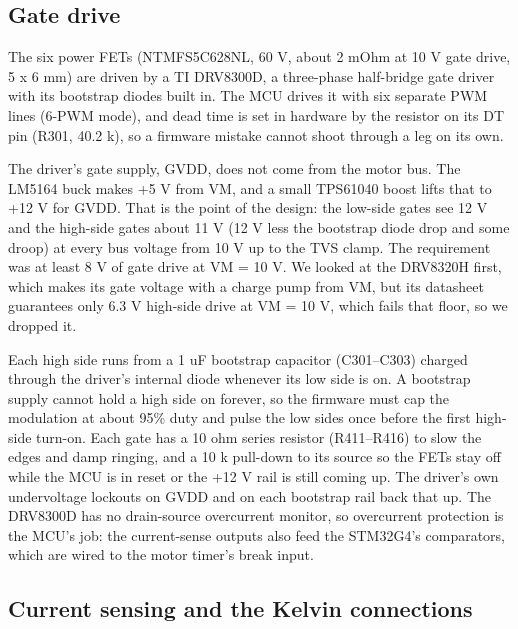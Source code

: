 
\subsection*{Gate drive}

The six power FETs (NTMFS5C628NL, 60 V, about 2 mOhm at 10 V gate drive,
5 x 6 mm) are driven by a TI DRV8300D, a three-phase half-bridge gate driver
with its bootstrap diodes built in. The MCU drives it with six separate PWM
lines (6-PWM mode), and dead time is set in hardware by the resistor on its DT
pin (R301, 40.2 k), so a firmware mistake cannot shoot through a leg on its own.

The driver's gate supply, GVDD, does not come from the motor bus. The LM5164
buck makes +5 V from VM, and a small TPS61040 boost lifts that to +12 V for
GVDD. That is the point of the design: the low-side gates see 12 V and the
high-side gates about 11 V (12 V less the bootstrap diode drop and some droop)
at every bus voltage from 10 V up to the TVS clamp. The requirement was at least
8 V of gate drive at VM = 10 V. We looked at the DRV8320H first, which makes its
gate voltage with a charge pump from VM, but its datasheet guarantees only 6.3 V
high-side drive at VM = 10 V, which fails that floor, so we dropped it.

Each high side runs from a 1 uF bootstrap capacitor (C301--C303) charged through
the driver's internal diode whenever its low side is on. A bootstrap supply
cannot hold a high side on forever, so the firmware must cap the modulation at
about 95\% duty and pulse the low sides once before the first high-side turn-on.
Each gate has a 10 ohm series resistor (R411--R416) to slow the edges and damp
ringing, and a 10 k pull-down to its source so the FETs stay off while the MCU is
in reset or the +12 V rail is still coming up. The driver's own undervoltage
lockouts on GVDD and on each bootstrap rail back that up. The DRV8300D has no
drain-source overcurrent monitor, so overcurrent protection is the MCU's job:
the current-sense outputs also feed the STM32G4's comparators, which are wired to
the motor timer's break input.

\subsection*{Current sensing and the Kelvin connections}

